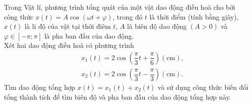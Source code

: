 \begin{bt}%
	Trong Vật lí, phương trình tổng quát của một vật dao động điều hoà cho bởi công thức $x(t)=A \cos (\omega t+\varphi)$, trong đó $t$ là thời điểm (tính bằng giây), $x(t)$ là li độ của vật tại thời điêm $t$, $A$ là biên độ dao động $(A>0)$ và $\varphi \in[-\pi ; \pi]$ là pha ban đầu của dao động.\\
	Xét hai dao động điều hoà có phương trình
	\begin{eqnarray*}
		&&x_1(t)=2 \cos \left(\dfrac{\pi}{3} t+\dfrac{\pi}{6}\right)(\mathrm{cm}), \\
		&&x_2(t)=2 \cos \left(\dfrac{\pi}{3} t-\dfrac{\pi}{3}\right)(\mathrm{cm}).
	\end{eqnarray*}
	Tìm dao động tổng hợp $x(t)=x_1(t)+x_2(t)$ và sử dụng công thức biến đổi tổng thành tích để tìm biên độ và pha ban đầu của dao động tổng hợp này.
\end{bt}

